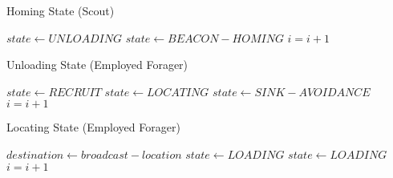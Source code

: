 \begin{algorithm}
\caption{Homing State (Scout)}
\label{algorithm:scout:homing}
\begin{algorithmic}[1]
	
\EndIf
{}
	\State {}
		\State $state \gets UNLOADING$
	\Else
		\State $state \gets BEACON-HOMING$	
	\EndIf
\EndIf
\State $i =i + 1$
\EndFunction
\end{algorithmic}
\end{algorithm}

\begin{algorithm}
\caption{Unloading State (Employed Forager)}
\label{algorithm:employedforager:unloading}
\begin{algorithmic}[1]
		\State {}
		\If{$\mu > \phi$}
			\State $state \gets RECRUIT$
		\Else
			\State $state \gets LOCATING$
		\EndIf
	\Else
		\State $state \gets SINK-AVOIDANCE$ 
	\EndIf
	\State $i =i + 1$
\EndFunction

\end{algorithmic}
\end{algorithm}

\begin{algorithm}
\caption{Locating State (Employed Forager)}
\label{algorithm:employedforager:locating}
\begin{algorithmic}[1]
		\State $destination \gets broadcast - location$
	\EndIf
	\State {}
	\State {}
		\State $state \gets LOADING$
		\State $state \gets LOADING$
	\EndIf
	\State $i =i + 1$
\EndFunction
\end{algorithmic}
\end{algorithm}

